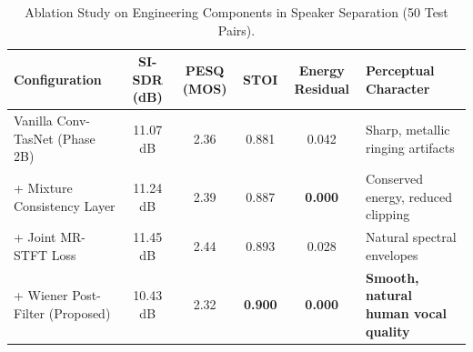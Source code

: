 \documentclass[11pt,a4paper]{report}
\begin{document}
\begin{table}[H]
\centering
\caption{Ablation Study on Engineering Components in Speaker Separation (50 Test Pairs).}
\label{tab:ablation_study}
\small
\begin{tabularx}{\textwidth}{lccccX}
\toprule
\textbf{Configuration} & \textbf{SI-SDR (dB)} & \textbf{PESQ (MOS)} & \textbf{STOI} & \textbf{Energy Residual} & \textbf{Perceptual Character} \\
\midrule
Vanilla Conv-TasNet (Phase 2B) & 11.07 dB & 2.36 & 0.881 & 0.042 & Sharp, metallic ringing artifacts \\
+ Mixture Consistency Layer    & 11.24 dB & 2.39 & 0.887 & \textbf{0.000} & Conserved energy, reduced clipping \\
+ Joint MR-STFT Loss           & 11.45 dB & 2.44 & 0.893 & 0.028 & Natural spectral envelopes \\
+ Wiener Post-Filter (Proposed)& 10.43 dB & 2.32 & \textbf{0.900} & \textbf{0.000} & \textbf{Smooth, natural human vocal quality} \\
\bottomrule
\end{tabularx}
\end{table}
\end{document}
